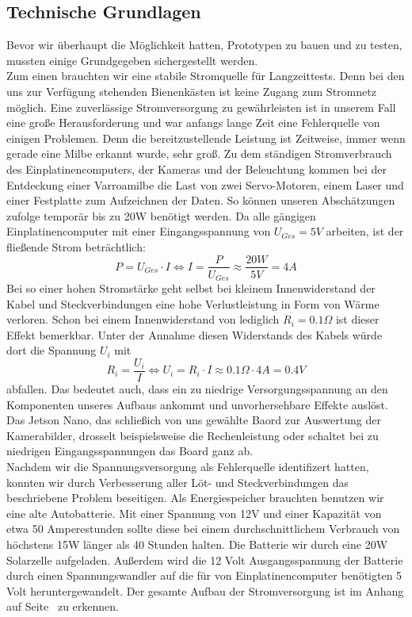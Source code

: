\documentclass[11pt,a4paper]{article}
\begin{document}
\subsection{Technische Grundlagen} 
Bevor wir überhaupt die Möglichkeit hatten, Prototypen zu bauen und zu testen, mussten einige Grundgegeben sichergestellt werden.\\
Zum einen brauchten wir eine stabile Stromquelle für Langzeittests. Denn bei den uns zur Verfügung stehenden Bienenkästen ist keine Zugang zum Stromnetz möglich. Eine zuverlässige Stromversorgung zu gewährleisten ist in unserem Fall eine große Herausforderung und war anfangs lange Zeit eine Fehlerquelle von einigen Problemen. Denn die bereitzustellende Leistung ist Zeitweise, immer wenn gerade eine Milbe erkannt wurde, sehr groß. Zu dem ständigen Stromverbrauch des Einplatinencomputers, der Kameras und der Beleuchtung kommen bei der Entdeckung einer Varroamilbe die Last von zwei Servo-Motoren, einem Laser und einer Festplatte zum Aufzeichnen der Daten. So können unseren Abschätzungen zufolge temporär bis zu 20W benötigt werden. Da alle gängigen Einplatinencomputer mit einer Eingangsspannung von $U_{Ges} = 5V$ arbeiten, ist der fließende Strom beträchtlich:
$$ P = U_{Ges} \cdot I \Longleftrightarrow I = \dfrac{P}{U_{Ges}} \approx \dfrac{20W}{5V} = 4A$$
Bei so einer hohen Stromstärke geht selbst bei kleinem Innenwiderstand der Kabel und Steckverbindungen eine hohe Verlustleistung in Form von Wärme verloren. Schon bei einem Innenwiderstand von lediglich $R_i = 0.1\varOmega$ ist dieser Effekt bemerkbar. Unter der Annahme diesen Widerstands des Kabels würde dort die Spannung $U_i$ mit
$$R_i = \dfrac{U_i}{I} \Longleftrightarrow U_i = R_i \cdot I \approx 0.1\varOmega \cdot 4A = 0.4V$$
abfallen. Das bedeutet auch, dass ein zu niedrige Versorgungsspannung an den Komponenten unseres Aufbaus ankommt und unvorhersehbare Effekte auslöst. Das Jetson Nano, das schließich von uns gewählte Baord zur Auswertung der Kamerabilder, drosselt beispielsweise die Rechenleistung oder schaltet bei zu niedrigen Eingangsspannungen das Board ganz ab.\\
Nachdem wir die Spannungsversorgung als Fehlerquelle identifizert hatten, konnten wir durch Verbesserung aller Löt- und Steckverbindungen das beschriebene Problem beseitigen. 
Als Energiespeicher brauchten benutzen wir eine alte Autobatterie. Mit einer Spannung von 12V und einer Kapazität von etwa 50 Amperestunden sollte diese bei einem durchschnittlichem Verbrauch von höchstens 15W länger als 40 Stunden halten. Die Batterie wir durch eine 20W Solarzelle aufgeladen. Außerdem wird die 12 Volt Ausgangsspannung der Batterie durch einen Spannungswandler auf die für von Einplatinencomputer benötigten 5 Volt heruntergewandelt. Der gesamte Aufbau der Stromversorgung ist im Anhang auf Seite \pageref*{fig:power-supply-complete} \, zu erkennen.\\
\end{document}
